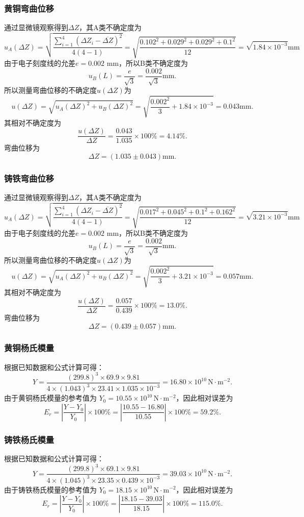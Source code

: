 \documentclass[zihao=5, UTF8]{article}
\theoremstyle{MyLineTheoremStyle} %
\theoremstyle{MyBlockTheoremStyle} %
\theoremstyle{MySubsubsectionStyle} %
\begin{document}
\subsubsection{黄铜弯曲位移}
通过显微镜观察得到$\Delta Z$，其A类不确定度为
\[ u_A (\Delta Z) = \sqrt{\frac{\sum_{i=1}^{4}(\Delta Z_i - \overline{\Delta Z})^2}{4(4-1)}} = \sqrt{\frac{0.102^2 + 0.029^2 + 0.029^2 + 0.1^2}{12}} = \sqrt{1.84 \times 10^{-3}} \text{mm} \]
由于电子刻度线的允差$e=0.002$ mm，所以B类不确定度为
\[ u_B (L) = \frac{e}{\sqrt{3}} = \frac{0.002}{\sqrt{3}} \text{mm}. \]
所以测量弯曲位移的不确定度$u(\Delta Z)$为
\[ u(\Delta Z) = \sqrt{u_A (\Delta Z)^2 + u_B (\Delta Z)^2} = \sqrt{\frac{0.002^2}{3} + 1.84 \times 10^{-3}} = 0.043 \text{mm}. \]
其相对不确定度为
\[ \frac{u(\Delta Z)}{\Delta Z} = \frac{0.043}{1.035} \times 100\% = 4.14\%. \]
弯曲位移为
\[ \Delta Z = (1.035 \pm 0.043) \text{mm}. \]

\subsubsection{铸铁弯曲位移}
通过显微镜观察得到$\Delta Z$，其A类不确定度为
\[ u_A (\Delta Z) = \sqrt{\frac{\sum_{i=1}^{4}(\Delta Z_i - \overline{\Delta Z})^2}{4(4-1)}} = \sqrt{\frac{0.017^2 + 0.045^2 + 0.1^2 + 0.162^2}{12}} = \sqrt{3.21 \times 10^{-3}} \text{mm} \]
由于电子刻度线的允差$e=0.002$ mm，所以B类不确定度为
\[ u_B (L) = \frac{e}{\sqrt{3}} = \frac{0.002}{\sqrt{3}} \text{mm}. \]
所以测量弯曲位移的不确定度$u(\Delta Z)$为
\[ u(\Delta Z) = \sqrt{u_A (\Delta Z)^2 + u_B (\Delta Z)^2} = \sqrt{\frac{0.002^2}{3} + 3.21 \times 10^{-3}} = 0.057 \text{mm}. \]
其相对不确定度为
\[ \frac{u(\Delta Z)}{\Delta Z} = \frac{0.057}{0.439} \times 100\% = 13.0\%. \]
弯曲位移为
\[ \Delta Z = (0.439 \pm 0.057) \text{mm}. \]

\subsubsection{黄铜杨氏模量}
根据已知数据和公式计算可得：
\[ Y=\frac{(299.8)^3 \times 69.9 \times 9.81}{4 \times (1.043)^3 \times 23.41 \times 1.035 \times 10^{-3}} = 16.80 \times 10^{10} \, \text{N}\cdot\text{m}^{-2}. \]
由于黄铜杨氏模量的参考值为 \( Y_0 = 10.55 \times 10^{10} \, \text{N}\cdot\text{m}^{-2} \)，因此相对误差为
\[ E_r = \left| \frac{Y - Y_0}{Y_0} \right| \times 100\% = \left| \frac{10.55 - 16.80}{10.55} \right| \times 100\% = 59.2\%. \]

\subsubsection{铸铁杨氏模量}
根据已知数据和公式计算可得：
\[ Y=\frac{(299.8)^3 \times 69.1 \times 9.81}{4 \times (1.045)^3 \times 23.35 \times 0.439 \times 10^{-3}} = 39.03 \times 10^{10} \, \text{N}\cdot\text{m}^{-2}. \]
由于铸铁杨氏模量的参考值为 \( Y_0 = 18.15 \times 10^{10} \, \text{N}\cdot\text{m}^{-2} \)，因此相对误差为
\[ E_r = \left| \frac{Y - Y_0}{Y_0} \right| \times 100\% = \left| \frac{18.15 - 39.03}{18.15} \right| \times 100\% = 115.0\%. \]
\end{document}
